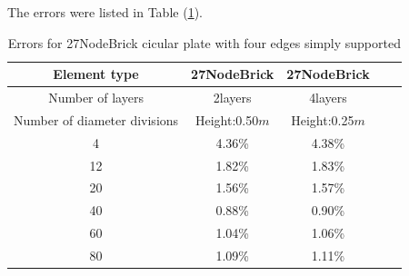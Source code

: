 \documentclass[fleqn,11pt]{article}
\begin{document}
The errors were listed in Table (\ref{table Errors for 27NodeBrick cicular plate with four edges simply supported}).

\begin{table}[H]
  \centering
  \caption{Errors for 27NodeBrick cicular plate with four edges simply supported}
  \label{table Errors for 27NodeBrick cicular plate with four edges simply supported}
  \begin{tabular}{|c|c|c|c|c|}
  \hline
  Element type     & 27NodeBrick     & 27NodeBrick      \\ \hline
  Number of layers      & 2layers         & 4layers          \\ \hline
  Number of diameter divisions & Height:0.50$m$ & Height:0.25$m$  \\ \hline
  4            & 4.36\% & 4.38\%      \\ \hline
  12           & 1.82\% & 1.83\%      \\ \hline
  20           & 1.56\% & 1.57\%      \\ \hline
  40           & 0.88\% & 0.90\%      \\ \hline
  60           & 1.04\% & 1.06\%      \\ \hline
  80           & 1.09\% & 1.11\%      \\
  \hline
  \end{tabular}
\end{table}

\end{document}
